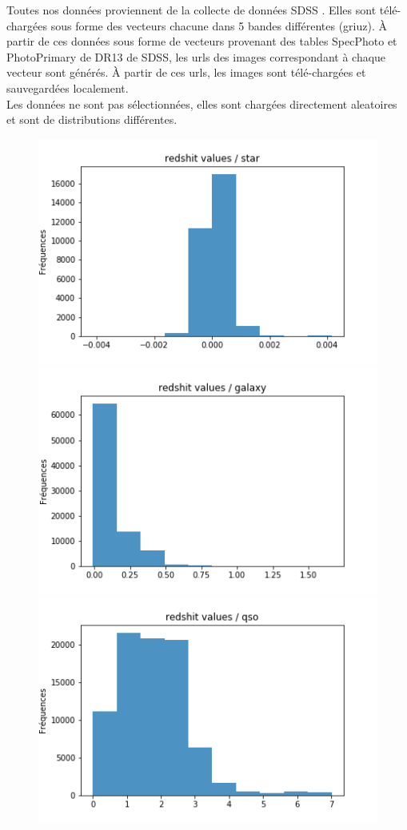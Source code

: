 Toutes nos données proviennent de la collecte de données SDSS . Elles sont télé-chargées sous forme des vecteurs chacune dans 5 bandes différentes (griuz). À partir de ces données sous forme de vecteurs provenant des tables SpecPhoto et PhotoPrimary de DR13 de SDSS, les urls des images correspondant à chaque vecteur sont générés. À partir de ces urls, les images sont télé-chargées et sauvegardées localement. \\

Les données ne sont pas sélectionnées, elles sont chargées directement aleatoires et sont de distributions différentes.
\begin{figure}[H]
	\centering
	\includegraphics[scale = 0.3]{images/star.png}
	\includegraphics[scale = 0.3]{images/galaxy.png}
	\includegraphics[scale = 0.3]{images/qso.png}

\end{figure}

